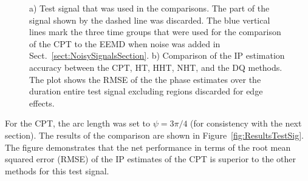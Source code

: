 \documentclass[11pt,draftcls,onecolumn]{IEEEtran}
\begin{document}
\begin{figure}[ht]
	\centering
	\caption{a) Test signal that was used in the comparisons. The part of the signal shown by the dashed line was discarded. The blue vertical lines mark the three time groups that were used for the comparison of the CPT to the EEMD when noise was added in Sect.~\ref{sect:NoisySignalsSection}. b) Comparison of the IP estimation accuracy between the CPT, HT, HHT, NHT, and the DQ methods. The plot shows the RMSE of the the phase estimates over the duration entire test signal excluding regions discarded for edge effects.}
\end{figure}

For the CPT, the arc length was set to $\psi=3\pi/4$ (for consistency with the next section). The results of the comparison are shown in Figure~\ref{fig:ResultsTestSig}. The figure demonstrates that the net performance in terms of the root mean squared error (RMSE) of the IP estimates of the CPT is superior to the other methods for this test signal.
\end{document}
